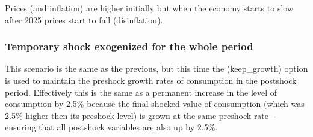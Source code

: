 \documentclass[letterpaper,10pt,english]{jupyterBook}
\begin{document}
\sphinxAtStartPar
Prices (and inflation) are higher initially but when the economy starts to slow after 2025 prices start to fall (disinflation).


\subsubsection{Temporary shock exogenized for the whole period}
\label{\detokenize{content/06_WBModels/LoadingWBModel:id4}}
\sphinxAtStartPar
This scenario is the same as the previous, but this time the  (keep\_growth) option is used to maintain the pre\sphinxhyphen{}shock growth rates of consumption in the post\sphinxhyphen{}shock period.  Effectively this is the same as a permanent increase in the level of consumption by 2.5\% because the final shocked value of consumption (which was 2.5\% higher then its pre\sphinxhyphen{}shock level) is grown at the same pre\sphinxhyphen{}shock rate – ensuring that all post\sphinxhyphen{}shock variables are also up by 2.5\%.
\end{document}
